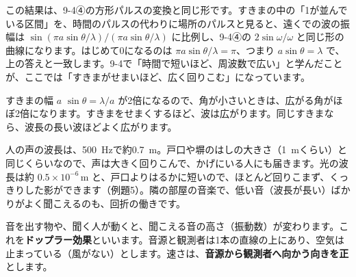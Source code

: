 この結果は、9-4④の方形パルスの変換と同じ形です。すきまの中の「1が並んでいる区間」を、時間のパルスの代わりに場所のパルスと見ると、遠くでの波の振幅は $\sin(\pi a\sin\theta/\lambda)\big/(\pi a\sin\theta/\lambda)$ に比例し、9-4④の $2\sin\omega/\omega$ と同じ形の曲線になります。はじめて0になるのは $\pi a\sin\theta/\lambda=\pi$、つまり $a\sin\theta=\lambda$ で、上の答えと一致します。9-4で「時間で短いほど、周波数で広い」と学んだことが、ここでは「すきまがせまいほど、広く回りこむ」になっています。

\begin{bkfigure}
\label{ph:波-8:fig-slitI}
\end{bkfigure}

\begin{phbaisuru}[半分]{すきまの幅 $a$}
$\sin\theta=\lambda/a$ が2倍になるので、角が小さいときは、広がる角がほぼ2倍になります。すきまをせまくするほど、波は広がります。同じすきまなら、波長の長い波ほどよく広がります。
\end{phbaisuru}

\begin{phmijika}
人の声の波長は、\qty{500}{Hz}で約\qty{0.7}{m}。戸口や塀のはしの大きさ（\qty{1}{m}くらい）と同じくらいなので、声は大きく回りこんで、かげにいる人にも届きます。光の波長は約 $0.5\times10^{-6}$\,m と、戸口よりはるかに短いので、ほとんど回りこまず、くっきりした影ができます（例題5）。隣の部屋の音楽で、低い音（波長が長い）ばかりがよく聞こえるのも、回折の働きです。
\end{phmijika}

\label{ph:波-8:sec5}
音を出す物や、聞く人が動くと、聞こえる音の高さ（振動数）が変わります。これを\textbf{ドップラー効果}といいます。音源と観測者は1本の直線の上にあり、空気は止まっている（風がない）とします。速さは、\textbf{音源から観測者へ向かう向きを正}とします。

